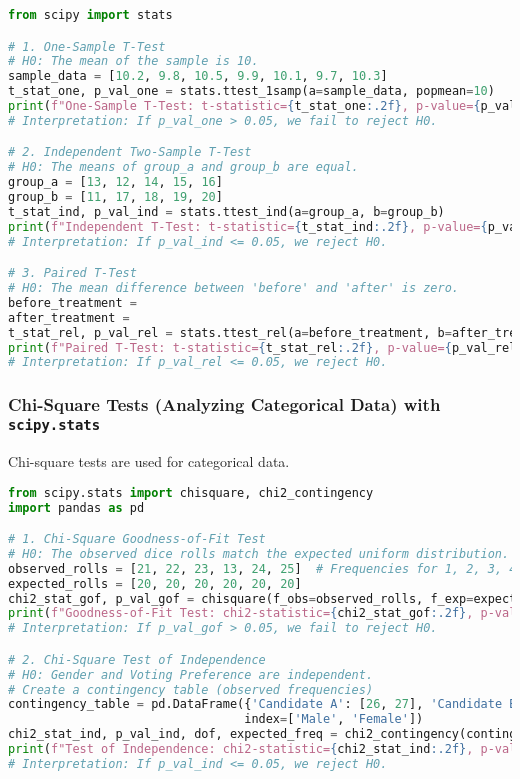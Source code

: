 \documentclass[11pt,a4paper]{article}
\begin{document}
\begin{lstlisting}[language=Python]
from scipy import stats

# 1. One-Sample T-Test
# H0: The mean of the sample is 10.
sample_data = [10.2, 9.8, 10.5, 9.9, 10.1, 9.7, 10.3]
t_stat_one, p_val_one = stats.ttest_1samp(a=sample_data, popmean=10)
print(f"One-Sample T-Test: t-statistic={t_stat_one:.2f}, p-value={p_val_one:.2f}")
# Interpretation: If p_val_one > 0.05, we fail to reject H0.

# 2. Independent Two-Sample T-Test
# H0: The means of group_a and group_b are equal.
group_a = [13, 12, 14, 15, 16]
group_b = [11, 17, 18, 19, 20]
t_stat_ind, p_val_ind = stats.ttest_ind(a=group_a, b=group_b)
print(f"Independent T-Test: t-statistic={t_stat_ind:.2f}, p-value={p_val_ind:.2f}")
# Interpretation: If p_val_ind <= 0.05, we reject H0.

# 3. Paired T-Test
# H0: The mean difference between 'before' and 'after' is zero.
before_treatment = 
after_treatment = 
t_stat_rel, p_val_rel = stats.ttest_rel(a=before_treatment, b=after_treatment)
print(f"Paired T-Test: t-statistic={t_stat_rel:.2f}, p-value={p_val_rel:.2f}")
# Interpretation: If p_val_rel <= 0.05, we reject H0.
\end{lstlisting}

\subsubsection{Chi-Square Tests (Analyzing Categorical Data) with \texttt{scipy.stats}}

Chi-square tests are used for categorical data.

\begin{lstlisting}[language=Python]
from scipy.stats import chisquare, chi2_contingency
import pandas as pd

# 1. Chi-Square Goodness-of-Fit Test
# H0: The observed dice rolls match the expected uniform distribution.
observed_rolls = [21, 22, 23, 13, 24, 25]  # Frequencies for 1, 2, 3, 4, 5, 6
expected_rolls = [20, 20, 20, 20, 20, 20]
chi2_stat_gof, p_val_gof = chisquare(f_obs=observed_rolls, f_exp=expected_rolls)
print(f"Goodness-of-Fit Test: chi2-statistic={chi2_stat_gof:.2f}, p-value={p_val_gof:.2f}")
# Interpretation: If p_val_gof > 0.05, we fail to reject H0.

# 2. Chi-Square Test of Independence
# H0: Gender and Voting Preference are independent.
# Create a contingency table (observed frequencies)
contingency_table = pd.DataFrame({'Candidate A': [26, 27], 'Candidate B': },
                                 index=['Male', 'Female'])
chi2_stat_ind, p_val_ind, dof, expected_freq = chi2_contingency(contingency_table)
print(f"Test of Independence: chi2-statistic={chi2_stat_ind:.2f}, p-value={p_val_ind:.2f}")
# Interpretation: If p_val_ind <= 0.05, we reject H0.
\end{lstlisting}
\end{document}
